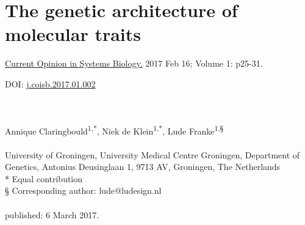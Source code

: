 \chapterfont{\color{LightBlue}}  %
\sectionfont{\color{LightBlue}}  %
\subsectionfont{\color{LightBlue}}  %

\renewcommand\pcolor{LightBlue}
\renewcommand{\headrule}{\hbox to\headwidth{%
		\color{LightBlue}\leaders\hrule height \headrulewidth\hfill}} %
\fancyfoot[LE,RO]{\thepage}

{ \Large {} }

\chapter[The genetic architecture of molecular traits]{The genetic architecture of molecular traits}
\chaptermark{}
\label{chap:chapter2-genetic-architecture}

\hfill \underline{Current Opinion in Systems Biology.} 2017 Feb 16; Volume 1: p25-31.

\hfill DOI: \href{https://doi.org/10.1016/j.coisb.2017.01.002}{j.coisb.2017.01.002}


\noindent
\\
\\
Annique Claringbould\textsuperscript{1,*}, Niek de Klein\textsuperscript{1,*}, Lude Franke\textsuperscript{1,§}
\\
\\
 University of Groningen, University Medical Centre Groningen, Department of Genetics, Antonius Deusinglaan 1, 9713 AV, Groningen, The Netherlands\\
* Equal contribution\\
§ Corresponding author: lude@ludesign.nl
\\
\\
\noindent
published: 6 March 2017.



